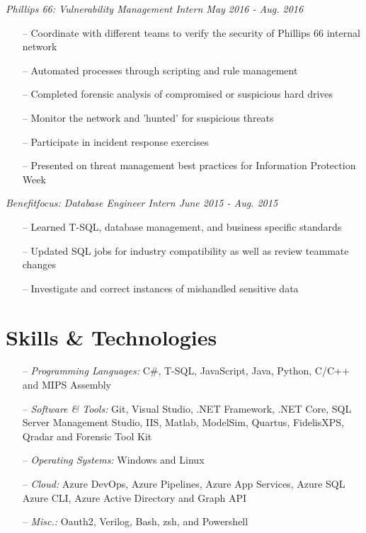 \documentclass[line,overlapped,9pt]{res}
\begin{document}
\begin{resume}
                 {\sl Phillips 66: Vulnerability Management Intern
                   \hfill        May 2016 - Aug. 2016}
                  \begin{itemize}
                  \item[--] Coordinate with different teams to verify the security of
                    Phillips 66 internal network
                  \item[--] Automated processes through scripting and rule management
                  \item[--]Completed forensic analysis of compromised or suspicious
                    hard drives
                  \item[--] Monitor the network and 'hunted' for suspicious threats
                  \item[--] Participate in incident response exercises 
                  \item[--] Presented on threat management best practices for Information
                    Protection Week
                  \end{itemize}

                  {\sl Benefitfocus: Database Engineer Intern 
                    \hfill        June 2015 - Aug. 2015}
                  \begin{itemize}
                  \item[--] Learned T-SQL, database management, and business specific
                    standards
                  \item[--] Updated SQL jobs for industry compatibility as well as review
                    teammate changes
                  \item[--] Investigate and correct instances of mishandled sensitive data
                  \end{itemize}

     \section{Skills \& Technologies}

            \begin{itemize} 
            \item[--] {\sl Programming Languages:} C\#, T-SQL, JavaScript, Java, Python, C/C++ and MIPS Assembly 
            \item[--] {\sl Software \& Tools:} Git, Visual Studio, .NET Framework, .NET Core,
              SQL Server Management Studio, IIS, Matlab, ModelSim, Quartus,
              FidelisXPS, Qradar and Forensic Tool Kit 
            \item[--] {\sl Operating Systems:} Windows and Linux
            \item[--] {\sl Cloud:} Azure DevOps, Azure Pipelines, Azure App Services, Azure SQL
              Azure CLI, Azure Active Directory and Graph API
            \item[--] {\sl Misc.:} Oauth2, Verilog, Bash, zsh, and Powershell  
            \end{itemize} 


\end{resume}
\end{document}
